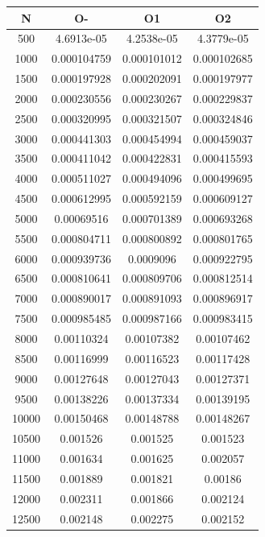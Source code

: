 \begin{center}
\begin{tabular}{| c | c | c | c |}
\hline
\textbf{N} & \textbf{O-} & \textbf{O1} & \textbf{O2} \\ \hline
500 & 4.6913e-05 & 4.2538e-05 & 4.3779e-05 \\ \hline
1000 & 0.000104759 & 0.000101012 & 0.000102685 \\ \hline
1500 & 0.000197928 & 0.000202091 & 0.000197977 \\ \hline
2000 & 0.000230556 & 0.000230267 & 0.000229837 \\ \hline
2500 & 0.000320995 & 0.000321507 & 0.000324846 \\ \hline
3000 & 0.000441303 & 0.000454994 & 0.000459037 \\ \hline
3500 & 0.000411042 & 0.000422831 & 0.000415593 \\ \hline
4000 & 0.000511027 & 0.000494096 & 0.000499695 \\ \hline
4500 & 0.000612995 & 0.000592159 & 0.000609127 \\ \hline
5000 & 0.00069516 & 0.000701389 & 0.000693268 \\ \hline
5500 & 0.000804711 & 0.000800892 & 0.000801765 \\ \hline
6000 & 0.000939736 & 0.0009096 & 0.000922795 \\ \hline
6500 & 0.000810641 & 0.000809706 & 0.000812514 \\ \hline
7000 & 0.000890017 & 0.000891093 & 0.000896917 \\ \hline
7500 & 0.000985485 & 0.000987166 & 0.000983415 \\ \hline
8000 & 0.00110324 & 0.00107382 & 0.00107462 \\ \hline
8500 & 0.00116999 & 0.00116523 & 0.00117428 \\ \hline
9000 & 0.00127648 & 0.00127043 & 0.00127371 \\ \hline
9500 & 0.00138226 & 0.00137334 & 0.00139195 \\ \hline
10000 & 0.00150468 & 0.00148788 & 0.00148267 \\ \hline
10500 & 0.001526 & 0.001525 & 0.001523 \\ \hline
11000 & 0.001634 & 0.001625 & 0.002057 \\ \hline
11500 & 0.001889 & 0.001821 & 0.00186 \\ \hline
12000 & 0.002311 & 0.001866 & 0.002124 \\ \hline
12500 & 0.002148 & 0.002275 & 0.002152 \\ \hline
\hline
\end{tabular}
\end{center}
